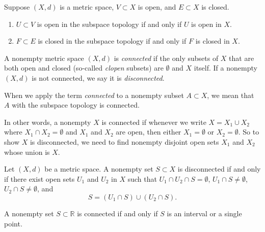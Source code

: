 \documentclass[../main.tex]{subfiles}
\begin{document}
    \begin{proposition} \label{prop:subspace_topology_open_closed}
    Suppose \( (X, d) \) is a metric space, \( V \subset X \) is open, and \( E \subset X \) is closed.
    \begin{enumerate}
        \item \( U \subset V \) is open in the subspace topology if and only if \( U \) is open in \( X \).
        \item \( F \subset E \) is closed in the subspace topology if and only if \( F \) is closed in \( X \).
    \end{enumerate}
    \end{proposition}
    

    \begin{definition} \label{def:connected_space}
        A nonempty metric space \( (X, d) \) is \textit{connected} if the only subsets of \( X \) that are both open and closed (so-called \textit{clopen} subsets) are \( \emptyset \) and \( X \) itself. If a nonempty \( (X, d) \) is not connected, we say it is \textit{disconnected}. 
        
        When we apply the term \textit{connected} to a nonempty subset \( A \subset X \), we mean that \( A \) with the subspace topology is connected.
        
        In other words, a nonempty \( X \) is connected if whenever we write \( X = X_1 \cup X_2 \) where \( X_1 \cap X_2 = \emptyset \) and \( X_1 \) and \( X_2 \) are open, then either \( X_1 = \emptyset \) or \( X_2 = \emptyset \). So to show \( X \) is disconnected, we need to find nonempty disjoint open sets \( X_1 \) and \( X_2 \) whose union is \( X \).
        \end{definition}
        
        \begin{proposition} \label{prop:disconnected_set}
        Let \( (X, d) \) be a metric space. A nonempty set \( S \subset X \) is disconnected if and only if there exist open sets \( U_1 \) and \( U_2 \) in \( X \) such that \( U_1 \cap U_2 \cap S = \emptyset \), \( U_1 \cap S \neq \emptyset \), \( U_2 \cap S \neq \emptyset \), and
        \[
        S = (U_1 \cap S) \cup (U_2 \cap S).
        \]
        \end{proposition}
        
        \begin{proposition} \label{prop:connected_real_set}
        A nonempty set \( S \subset \mathbb{R} \) is connected if and only if \( S \) is an interval or a single point.
        \end{proposition}
        
\end{document}
